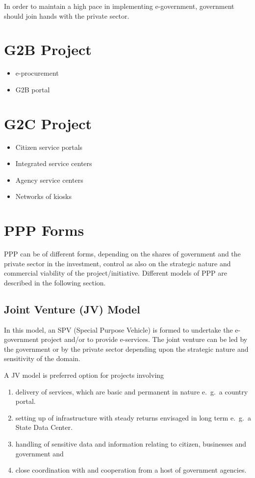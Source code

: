 In order to maintain a high pace in implementing e-government, government should join hands with the private sector.

\section{G2B Project}
\begin{itemize}
	\item e-procurement
	\item G2B portal
\end{itemize}

\section{G2C Project}
\begin{itemize}
	\item Citizen service portals
	\item Integrated service centers
	\item Agency service centers 
	\item Networks of kiosks
\end{itemize}

\section{PPP Forms}
PPP can be of different forms, depending on the shares of government and the private sector in the investment, control as also on the strategic nature and commercial viability of the project/initiative. Different models of PPP are described in the following section.

\subsection[JV Model]{Joint Venture (JV) Model}
In this model, an SPV (Special Purpose Vehicle) is formed to undertake the e-government project and/or to provide e-services. The joint venture can be led by the government or by the private sector depending upon the strategic nature and sensitivity of the domain.

A JV model is preferred option for projects involving
\begin{enumerate}[label=(\alph*)]
	\item delivery of services, which are basic and permanent in nature e.\ g.\ a country portal.
	\item setting up of infrastructure with steady returns envisaged in long term e.\ g.\ a State Data Center.
	\item handling of sensitive data and information relating to citizen, businesses and government and
	\item close coordination with and cooperation from  a host of government agencies.
\end{enumerate}

